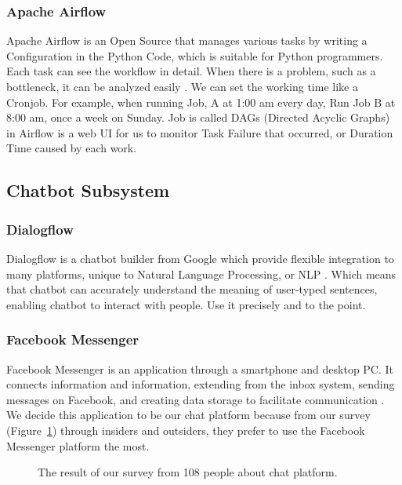 \documentclass[12pt,oneside,openright,a4paper]{cpe-english-project}
\begin{document}
\subsubsection{Apache Airflow}
Apache Airflow is an Open Source that manages various tasks by writing a Configuration in
the Python Code, which is suitable for Python programmers. Each task can see the workflow
in detail. When there is a problem, such as a bottleneck, it can be analyzed easily \cite{apache_airflow}.
We can set the working time like a Cronjob. For example, when running Job, A at 1:00 am
every day, Run Job B at 8:00 am, once a week on Sunday. Job is called DAGs
(Directed Acyclic Graphs) in Airflow is a web UI for us to monitor Task Failure
that occurred, or Duration Time caused by each work.

\subsection{Chatbot Subsystem}
\subsubsection{Dialogflow}
Dialogflow is a chatbot builder from Google which provide flexible integration to many platforms,
unique to Natural Language Processing, or NLP \cite{dialogflow}. Which means that chatbot can
accurately understand the meaning of user-typed sentences, enabling chatbot to interact with people.
Use it precisely and to the point.

\subsubsection{Facebook Messenger}
Facebook Messenger is an application through a smartphone and desktop PC. It connects information
and information, extending from the inbox system, sending messages on Facebook, and creating data
storage to facilitate communication \cite{wiki_fb_messenger}.\\
We decide this application to be our chat platform because from our survey (Figure~\ref*{fig:ch3_result_survey})
through insiders and outsiders, they prefer to use the Facebook Messenger platform the most.

\begin{figure}[h!]
  \centering
  \setlength{\fboxrule}{0.2mm}
  \setlength{\fboxsep}{0.5cm}
  \caption{The result of our survey from 108 people about chat platform.}
  \label{fig:ch3_result_survey}
\end{figure}
\end{document}
